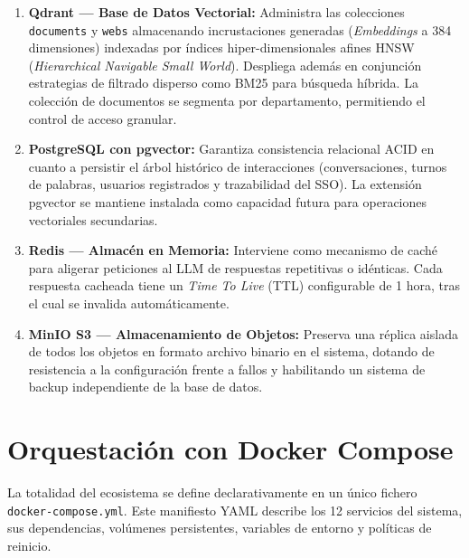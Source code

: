 \begin{enumerate}
    \item \textbf{Qdrant --- Base de Datos Vectorial:} Administra las colecciones \texttt{documents} y \texttt{webs} almacenando incrustaciones generadas (\textit{Embeddings} a 384 dimensiones) indexadas por índices hiper-dimensionales afines HNSW (\textit{Hierarchical Navigable Small World}). Despliega además en conjunción estrategias de filtrado disperso como BM25 para búsqueda híbrida. La colección de documentos se segmenta por departamento, permitiendo el control de acceso granular.

    \item \textbf{PostgreSQL con pgvector:} Garantiza consistencia relacional ACID en cuanto a persistir el árbol histórico de interacciones (conversaciones, turnos de palabras, usuarios registrados y trazabilidad del SSO). La extensión pgvector se mantiene instalada como capacidad futura para operaciones vectoriales secundarias.

    \item \textbf{Redis --- Almacén en Memoria:} Interviene como mecanismo de caché para aligerar peticiones al LLM de respuestas repetitivas o idénticas. Cada respuesta cacheada tiene un \textit{Time To Live} (TTL) configurable de 1 hora, tras el cual se invalida automáticamente.

    \item \textbf{MinIO S3 --- Almacenamiento de Objetos:} Preserva una réplica aislada de todos los objetos en formato archivo binario en el sistema, dotando de resistencia a la configuración frente a fallos y habilitando un sistema de backup independiente de la base de datos.
\end{enumerate}

\section{Orquestación con Docker Compose}

La totalidad del ecosistema se define declarativamente en un único fichero \texttt{docker-compose.yml}. Este manifiesto YAML describe los 12 servicios del sistema, sus dependencias, volúmenes persistentes, variables de entorno y políticas de reinicio.

